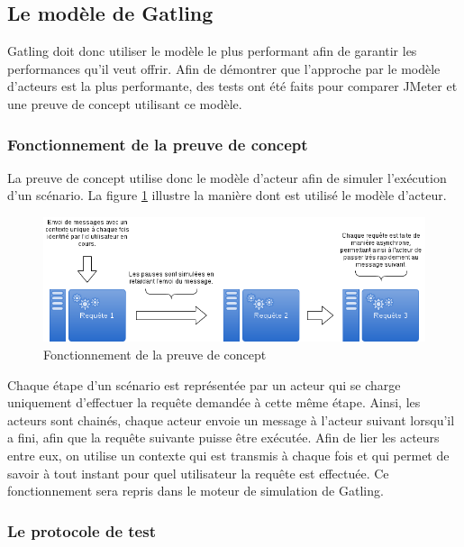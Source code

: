 \subsection{Le modèle de Gatling}
Gatling doit donc utiliser le modèle le plus performant afin de garantir les performances qu'il veut offrir. Afin de démontrer que l'approche par le modèle d'acteurs est la plus performante, des tests ont été faits pour comparer JMeter et une preuve de concept utilisant ce modèle.

\subsubsection{Fonctionnement de la preuve de concept}
La preuve de concept utilise donc le modèle d'acteur afin de simuler l'exécution d'un scénario. La figure \ref{poc_actors} illustre la manière dont est utilisé le modèle d'acteur. 

\begin{figure}[h]
\begin{center}
\includegraphics[width=400pt]{img/poc_actors.png}
\end{center}
\caption{Fonctionnement de la preuve de concept}
\label{poc_actors}
\end{figure}

Chaque étape d'un scénario est représentée par un acteur qui se charge uniquement d'effectuer la requête demandée à cette même étape. Ainsi, les acteurs sont chainés, chaque acteur envoie un message à l'acteur suivant lorsqu'il a fini, afin que la requête suivante puisse être exécutée. Afin de lier les acteurs entre eux, on utilise un contexte qui est transmis à chaque fois et qui permet de savoir à tout instant pour quel utilisateur la requête est effectuée. Ce fonctionnement sera repris dans le moteur de simulation de Gatling.

\subsubsection{Le protocole de test}

